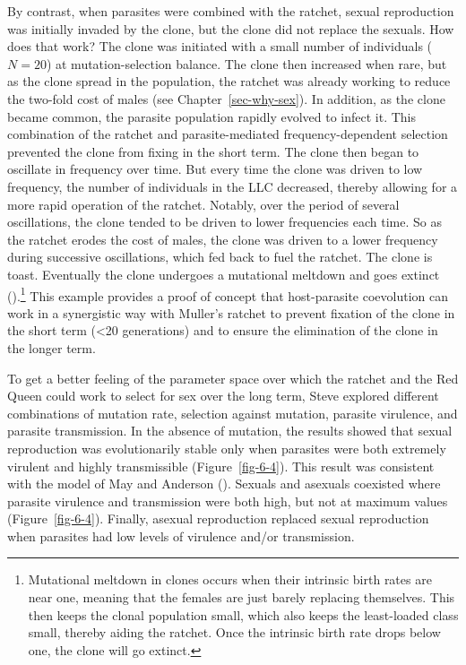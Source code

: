 \documentclass[
  letterpaper,
]{book}
\begin{document}
By contrast, when parasites were combined with the ratchet, sexual
reproduction was initially invaded by the clone, but the clone did not
replace the sexuals. How does that work? The clone was initiated with a
small number of individuals (\(N = 20\)) at mutation-selection balance.
The clone then increased when rare, but as the clone spread in the
population, the ratchet was already working to reduce the two-fold cost
of males (see Chapter~\ref{sec-why-sex}). In addition, as the clone
became common, the parasite population rapidly evolved to infect it.
This combination of the ratchet and parasite-mediated
frequency-dependent selection prevented the clone from fixing in the
short term. The clone then began to oscillate in frequency over time.
But every time the clone was driven to low frequency, the number of
individuals in the LLC decreased, thereby allowing for a more rapid
operation of the ratchet. Notably, over the period of several
oscillations, the clone tended to be driven to lower frequencies each
time. So as the ratchet erodes the cost of males, the clone was driven
to a lower frequency during successive oscillations, which fed back to
fuel the ratchet. The clone is toast. Eventually the clone undergoes a
mutational meltdown and goes extinct ().\footnote{Mutational meltdown in clones occurs when their
  intrinsic birth rates are near one, meaning that the females are just
  barely replacing themselves. This then keeps the clonal population
  small, which also keeps the least-loaded class small, thereby aiding
  the ratchet. Once the intrinsic birth rate drops below one, the clone
  will go extinct.} This example provides a proof of concept that
host-parasite coevolution can work in a synergistic way with Muller's
ratchet to prevent fixation of the clone in the short term (\textless20
generations) and to ensure the elimination of the clone in the longer
term.

To get a better feeling of the parameter space over which the ratchet
and the Red Queen could work to select for sex over the long term, Steve
explored different combinations of mutation rate, selection against
mutation, parasite virulence, and parasite transmission. In the absence
of mutation, the results showed that sexual reproduction was
evolutionarily stable only when parasites were both extremely virulent
and highly transmissible (Figure~\ref{fig-6-4}). This result was
consistent with the model of May and Anderson
(). Sexuals and asexuals coexisted where
parasite virulence and transmission were both high, but not at maximum
values (Figure~\ref{fig-6-4}). Finally, asexual reproduction replaced
sexual reproduction when parasites had low levels of virulence and/or
transmission.
\end{document}

